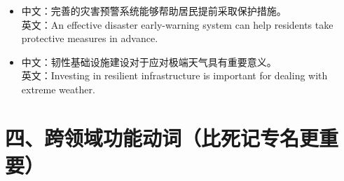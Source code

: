 \documentclass[a4paper,11pt,UTF8,fontset=none]{ctexart}
\begin{document}
\begin{itemize}[leftmargin=1.7em,itemsep=1pt,parsep=0pt,topsep=2pt]
\item \noindent 中文：完善的灾害预警系统能够帮助居民提前采取保护措施。\\ 英文：An effective disaster early-warning system can help residents take protective measures in advance.\par


\item \noindent 中文：韧性基础设施建设对于应对极端天气具有重要意义。\\ 英文：Investing in resilient infrastructure is important for dealing with extreme weather.\par


\end{itemize}

\par\vspace{4pt}{\color{RuleGray}\hrule}\vspace{4pt}

\section{四、跨领域功能动词（比死记专名更重要）}
\end{document}
